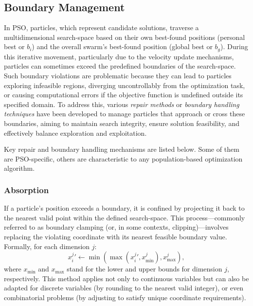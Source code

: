 {%






\subsection{Boundary Management}

In PSO, particles, which represent candidate solutions, traverse a multidimensional \gls{search-space} based on their own best-found positions (personal best or $b_i$) and the overall swarm's best-found position (global best or $b_g$). During this iterative movement, particularly due to the velocity update mechanisms, particles can sometimes exceed the predefined boundaries of the \gls{search-space}. Such boundary violations are problematic because they can lead to particles exploring infeasible regions, diverging uncontrollably from the optimization task, or causing computational errors if the objective function is undefined outside its specified domain. To address this, various \textit{repair methods} or \textit{boundary handling techniques} have been developed to manage particles that approach or cross these boundaries, aiming to maintain search integrity, ensure solution feasibility, and effectively balance exploration and exploitation.

Key repair and boundary handling mechanisms are listed below. Some of them are PSO-specific, others are characteristic to any population-based optimization algorithm.

\subsubsection{Absorption}
    
        If a particle’s position exceeds a boundary, it is confined by projecting it back to the nearest valid point within the defined \gls{search-space}. This process---commonly referred to as boundary clamping (or, in some contexts, clipping)---involves replacing the violating coordinate with its nearest feasible boundary value. Formally, for each dimension $j$:
    \begin{equation}
        x_{i}^{j}{}' \leftarrow \min(\max(x_{i}^{j}{}', x_{\min}^{j}), x_{\max}^{j}),
    \end{equation}
    where $x_{\min}$ and $x_{\max}$ stand for the lower and upper bounds for dimension $j$, respectively.
    This method applies not only to continuous variables but can also be adapted for discrete variables (by rounding to the nearest valid integer), or even combinatorial problems (by adjusting to satisfy unique coordinate requirements).
    
}
